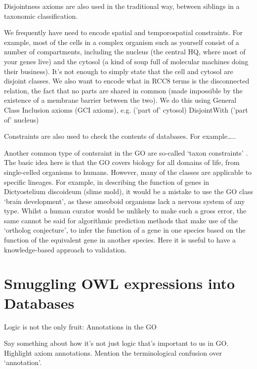 \documentclass{llncs}
\begin{document}
Disjointness axioms are also used in the traditional way, between siblings in a taxonomic classification.

We frequently have need to encode spatial and temporospatial constraints. For example, most of the cells in a complex organism such as yourself consist of a number of compartments, including the nucleus (the central HQ, where most of your genes live) and the cytosol (a kind of soup full of molecular machines doing their business). It’s not enough to simply state that the cell and cytosol are disjoint classes. We also want to encode what in RCC8 terms is the disconnected relation, the fact that no parts are shared in common (made impossible by the existence of a membrane barrier between the two). We do this using General Class Inclusion axioms (GCI axioms), e.g.
     ('part of' cytosol) DisjointWith ('part of' nucleus)

Constraints are also used to check the contents of databases. For example…..

Another common type of contsraint in the GO are so-called ‘taxon constraints’ \cite{Deegan2010}. The basic idea here is that the GO covers biology for all domains of life, from single-celled organisms to humans. However, many of the classes are applicable to specific lineages. For example, in describing the function of genes in Dictyostelium discoideum (slime mold), it would be a mistake to use the GO class ‘brain development’, as these ameoboid organisms lack a nervous system of any type. Whilst a human curator would be unlikely to make such a gross error, the same cannot be said for algorithmic prediction methods that make use of the ‘ortholog conjecture’, to infer the function of a gene in one species based on the function of the equivalent gene in another species. Here it is useful to have a knowledge-based approach to validation.


\section{Smuggling OWL expressions into Databases}


\cite{Huntley2014}
Logic is not the only fruit: Annotations in the GO

Say something about how it’s not just logic that’s important to us in GO. Highlight axiom annotations.
Mention the terminological confusion over ‘annotation’.

\end{document}
